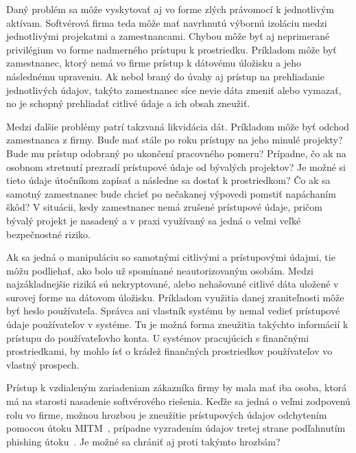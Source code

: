 \par Daný problém sa môže vyskytovať aj vo forme zlých právomocí k jednotlivým aktívam. Softvérová firma teda môže mať
navrhnutú výbornú izoláciu medzi jednotlivými projekatmi a zamestnancami. Chybou môže byť aj neprimerané privilégium vo
forme nadmerného prístupu k prostriedku. Príkladom môže byť zamestnanec, ktorý nemá vo firme prístup k dátovému úložisku
a jeho následnému upraveniu. Ak nebol braný do úvahy aj prístup na prehliadanie jednotlivých údajov, takýto zamestnanec
síce nevie dáta zmeniť alebo vymazať, no je schopný prehliadať citlivé údaje a ich obsah zneužiť.

\par Medzi ďalšie problémy patrí takzvaná likvidácia dát. Príkladom môže byť odchod zamestnanca z firmy. Buďe mať stále po roku
prístupy na jeho minulé projekty? Bude mu prístup odobraný po ukončení pracovného pomeru? Prípadne, čo ak na osobnom stretnutí
prezradí prístupové údaje od bývalých projektov? Je možné si tieto údaje útočníkom zapísať a následne sa dostať k prostriedkom?
Čo ak sa samotný zamestnanec bude chcieť po nečakanej výpovedi pomstiť napáchaním škôd? V situácii, kedy zamestnanec nemá
zrušené prístupové údaje, pričom bývalý projekt je nasadený a v praxi využívaný sa jedná o veľmi veľké bezpečnostné riziko.

\par Ak sa jedná o manipuláciu so samotnými citlivými a prístupovými údajmi, tie môžu podliehať, ako bolo už spomínané
neautorizovaným osobám. Medzi najzákladnejšie riziká sú nekryptované, alebo nehašované citlivé dáta uložené v surovej forme
na dátovom úložisku. Príkladom využitia danej zraniteľnosti môže byť heslo používateľa. Správca ani vlastník systému by nemal
vedieť prístupové údaje používateľov v systéme. Tu je možná forma zneužitia takýchto informácií k prístupu do používateľovho
konta. U systémov pracujúcich s finančnými prostriedkami, by mohlo ísť o krádež finančných prostriedkov používateľov vo
vlastný prospech.

\par Prístup k vzdialeným zariadeniam zákazníka firmy by mala mať iba osoba, ktorá má na starosti nasadenie softvérového riešenia.
Keďže sa jedná o veľmi zodpovenú rolu vo firme, možnou hrozbou je zneužitie prístupových údajov odchytením pomocou útoku
MITM~\cite{MITM}, prípadne vyzradením údajov tretej strane podľahnutím phishing útoku~\cite{Phishing}.
Je možné sa chrániť aj proti takýmto hrozbám?

